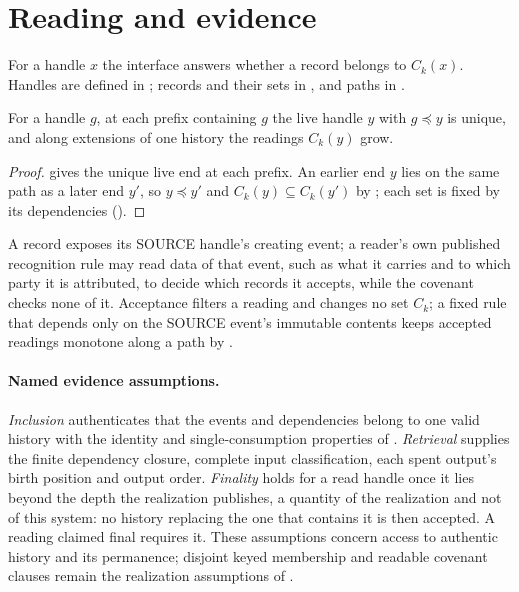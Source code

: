 \documentclass[../main.tex]{subfiles}
\begin{document}
\section{Reading and evidence}
\label{sec:kpc:interface}

\begin{definition}
\label{def:kpc-interface:membership-reading}
For a handle $x$ the interface answers whether a record belongs to $C_k(x)$.
Handles are defined in ; records and
their sets in , and paths in
.
\end{definition}

\begin{corollary}
\label{cor:kpc-interface:path-reading}
For a handle $g$, at each prefix containing $g$ the live handle $y$ with
$g\preceq y$ is unique, and along extensions of one history the readings
$C_k(y)$ grow.
\end{corollary}
\begin{proof}
 gives the unique live end at
each prefix. An earlier end $y$ lies on the same path as a later end $y'$,
so $y\preceq y'$ and $C_k(y)\subseteq C_k(y')$ by
; each set is fixed by its
dependencies ().
\end{proof}

\begin{remark}
\label{rem:kpc-interface:record-evidence}
A record exposes its SOURCE handle's creating event; a reader's own
published recognition rule may read data of that event, such as what it
carries and to which party it is attributed, to decide which records it
accepts, while the covenant checks none of it.
Acceptance filters a reading and changes no set $C_k$; a fixed rule that
depends only on the SOURCE event's immutable contents keeps accepted
readings monotone along a path by .
\end{remark}

\paragraph{Named evidence assumptions.}
\emph{Inclusion} authenticates that the events and dependencies belong
to one valid history with the identity and single-consumption properties
of .
\emph{Retrieval} supplies the finite dependency closure, complete input
classification, each spent output's birth position and output order.
\emph{Finality} holds for a read handle once it lies beyond the depth the
realization publishes, a quantity of the realization and not of this
system: no history replacing the one that contains it is then accepted.
A reading claimed final requires it.
These assumptions concern access to authentic history and its permanence;
disjoint keyed membership and readable covenant clauses remain the
realization
assumptions of .
\end{document}
